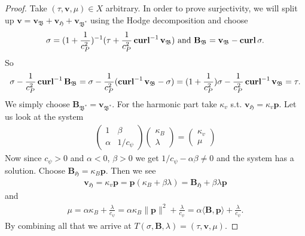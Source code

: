 \documentclass[../master_thesis.tex]{subfiles}
\begin{document}
\begin{proof}
    Take $(\tau, \mathbf{v},\mu) \in X$ arbitrary. In order to prove surjectivity, 
    we will split up $\mathbf{v} = \mathbf{v}_\mathfrak{B}
    + \mathbf{v}_\mathfrak{H} + \mathbf{v}_\mathfrak{B^*}$ using the Hodge decomposition
    and choose 
    \begin{align*}
        \sigma = (1+\frac{1}{c_P^2})^{-1} (\tau + \frac{1}{c_P^2} \veccurl^{-1} \mathbf{v}_\mathfrak{B}) 
        \text{ and }\mathbf{B}_\mathfrak{B} = \mathbf{v}_\mathfrak{B} - \veccurl \sigma.
    \end{align*}
    So 
    \begin{align*}
        \sigma -  \frac{1}{c_P^2} \veccurl^{-1}\mathbf{B}_\mathfrak{B} 
        = \sigma -  \frac{1}{c_P^2} (\veccurl^{-1} \mathbf{v}_\mathfrak{B} - \sigma)
        = (1+\frac{1}{c_P^2})\sigma - \frac{1}{c_P^2} \veccurl^{-1} \mathbf{v}_\mathfrak{B}
        = \tau.
    \end{align*}
    We simply choose $\mathbf{B}_\mathfrak{B^*} = \mathbf{v}_\mathfrak{B^*}$.
    For the harmonic part take $\kappa_v$ s.t. $\mathbf{v}_\mathfrak{H} = \kappa_v \mathbf{p}$.
    Let us look at the system 
    \begin{align*}
        \begin{pmatrix}
            1 & \beta 
            \\ \alpha & 1/c_\psi
        \end{pmatrix}
        \begin{pmatrix}
            \kappa_B 
            \\ \lambda 
        \end{pmatrix}
        = 
        \begin{pmatrix}
            \kappa_v 
            \\ \mu
        \end{pmatrix}
    \end{align*}
    Now since $c_\psi > 0$ and $\alpha < 0$, $\beta > 0$ we get 
    $1/c_\psi - \alpha \beta \neq 0$ and the system has a solution. 
    Choose $\mathbf{B}_\mathfrak{H} = \kappa_B \mathbf{p}$.
    Then we see 
    \begin{align*}
        \mathbf{v}_\mathfrak{H} = \kappa_v \mathbf{p} = \mathbf{p}(\kappa_B + \beta \lambda) 
        =  \mathbf{B}_\mathfrak{H} + \beta \lambda \mathbf{p}
    \end{align*}
    and 
    \begin{align*}
        \mu = \alpha \kappa_B + \frac{\lambda}{c_\psi}
        = \alpha \kappa_B \lVert \mathbf{p} \rVert^2 + \frac{\lambda}{c_\psi}
        = \alpha \langle \mathbf{B}, \mathbf{p} \rangle + \frac{\lambda}{c_\psi}.
    \end{align*}
    By combining all that we arrive at 
    $T(\sigma,\mathbf{B}, \lambda) = (\tau, \mathbf{v}, \mu)$.
\end{proof}
\end{document}
